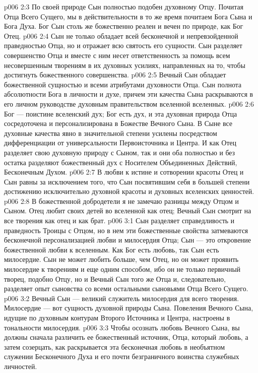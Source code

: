 \vs p006 2:3 По своей природе Сын полностью подобен духовному Отцу. Почитая Отца Всего Сущего, мы в действительности в то же время почитаем Бога Сына и Бога Духа. Бог Сын столь же божественно реален и вечен по природе, как Бог Отец.
\vs p006 2:4 Сын не только обладает всей бесконечной и непревзойденной праведностью Отца, но и отражает всю святость его сущности. Сын разделяет совершенство Отца и вместе с ним несет ответственность за помощь всем несовершенным творениям в их духовных усилиях, направленных на то, чтобы достигнуть божественного совершенства.
\vs p006 2:5 Вечный Сын обладает божественной сущностью и всеми атрибутами духовности Отца. Сын  полнота абсолютности Бога в личности и духе, причем эти качества Сына раскрываются в его личном руководстве духовным правительством вселенной вселенных.
\vs p006 2:6 Бог --- поистине вселенский дух; Бог есть дух, и эта духовная природа Отца сосредоточена и персонализирована в Божестве Вечного Сына. В Сыне все духовные качества явно в значительной степени усилены посредством дифференциации от универсальности Первоисточника и Центра. И как Отец разделяет свою духовную природу с Сыном, так и они оба полностью и без остатка разделяют божественный дух с Носителем Объединенных Действий, Бесконечным Духом.
\vs p006 2:7 В любви к истине и сотворении красоты Отец и Сын равны за исключением того, что Сын  посвятившим себя в большей степени достижению исключительно духовной красоты и духовных вселенских ценностей.
\vs p006 2:8 В божественной добродетели я не замечаю разницы между Отцом и Сыном. Отец любит своих детей во вселенной как отец; Вечный Сын смотрит на все творения как отец и как брат.
\vs p006 3:1 Сын разделяет справедливость и праведность Троицы с Отцом, но в нем эти божественные свойства затмеваются бесконечной персонализацией любви и милосердия Отца; Сын --- это откровение божественной любви к вселенным. Как Бог есть любовь, так Сын есть милосердие. Сын не может любить больше, чем Отец, но он может проявить милосердие к творениям и еще одним способом, ибо он не только первичный творец, подобно Отцу, но и Вечный Сын того же Отца и, следовательно, разделяет опыт сыновства со всеми остальными сыновьями Отца Всего Сущего.
\vs p006 3:2 Вечный Сын --- великий служитель милосердия для всего творения. Милосердие --- вот сущность духовной природы Сына. Повеления Вечного Сына, идущие по духовным контурам Второго Источника и Центра, настроены в тональности милосердия.
\vs p006 3:3 Чтобы осознать любовь Вечного Сына, вы должны сначала различить ее божественный источник, Отца, который  любовь, а затем созерцать, как раскрывается эта бесконечная любовь в необъятном служении Бесконечного Духа и его почти безграничного воинства служебных личностей.
